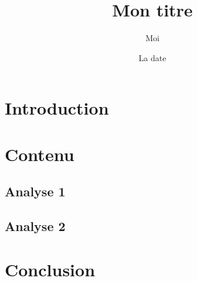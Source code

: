 \documentclass[12pt,a4paper]{article} %
\title{Mon titre} %
\author{Moi} %
\date{La date} %
\begin{document}
	
	\maketitle %
	\tableofcontents %
	
	\section{Introduction}
	
	\section{Contenu}
	
	\subsection{Analyse 1}
	
	\subsection{Analyse 2}
	
	\section{Conclusion}
	
	
	\printbibliography
	
\end{document}
